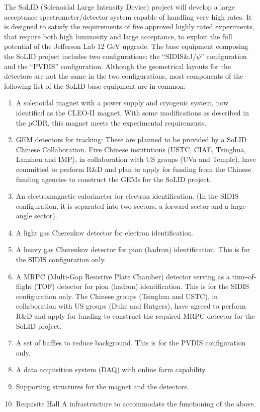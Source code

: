 \documentclass[12pt]{article}
\begin{document}
The SoLID (Solenoidal Large Intensity Device) project will develop a large acceptance spectrometer/detector system capable of handling very high rates. 
It is designed to satisfy the requirements of five approved highly rated experiments, that require both high luminosity and large acceptance, to exploit 
the full potential of the Jefferson Lab 12 GeV upgrade.
 The base equipment composing the SoLID project includes two configurations: the ``SIDIS\&J/$\psi$'' configuration and the ``PVDIS'' configuration.  
Although the geometrical layouts for the detectors are not the same in the two configurations, most components of the following list of the 
SoLID base equipment are in common:
\begin{enumerate}
    \item{A solenoidal magnet with a power supply and cryogenic system, now identified as the CLEO-II magnet. With some modifications as described in the pCDR\cite{pCDR}, this magnet meets the experimental requirements. 
}
     \item{GEM detectors for tracking: These are planned to be provided by a SoLID Chinese Collaboration. Five Chinese institutions (USTC, CIAE, Tsinghua, Lanzhou and IMP), in collaboration with US groups (UVa and Temple), have committed to perform R\&D and plan to apply for funding from the Chinese funding agencies to construct the GEMs for the SoLID project.}
    \item{An electromagnetic calorimeter for electron identification. (In the SIDIS configuration, it is separated into two sectors, a forward sector and a large-angle sector).}
    \item{A light gas Cherenkov detector for electron identification.}
\item{A heavy gas Cherenkov detector for pion (hadron) identification. This is for the SIDIS configuration only.}
     \item{ A MRPC (Multi-Gap Resistive Plate Chamber) detector serving as a time-of-flight (TOF) detector for pion (hadron) identification. 
This is for the SIDIS configuration only. The Chinese groups (Tsinghua and USTC), in 
collaboration with US groups (Duke and Rutgers), have agreed to perform R\&D and apply for funding to construct the required MRPC detector for the SoLID project.}
\item{A set of baffles to reduce background. This is for the PVDIS configuration only.}
    \item{A data acquisition system (DAQ) with online farm capability.}
    \item{Supporting structures for the magnet and the detectors.}
   \item{Requisite Hall A infrastructure to accommodate the functioning of the above.} 
    \end{enumerate}
\end{document}
